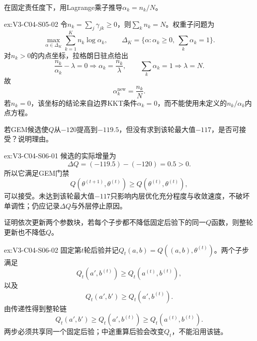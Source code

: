 \begin{SLChapterExercisePairSection}
\begin{exercise}\label{ex:V3-C04-S05-02}
在固定责任度下，用Lagrange乘子推导$\alpha_k=n_k/N$。
\end{exercise}
\ifSLFullEdition
{}\label{sol:V3-C04-S05-02}
\begin{chapterexercisesolution}{ex:V3-C04-S05-02}
令$n_k=\sum_j\gamma_{jk}\geq0$，则$\sum_kn_k=N$。权重子问题为
\[
\max_{\alpha\in\Delta_K}\sum_{k=1}^{K}n_k\log\alpha_k,
\qquad
\Delta_K=\{\alpha:\alpha_k\geq0,\ \sum_k\alpha_k=1\}.
\]
对$n_k>0$的内点坐标，拉格朗日驻点给出
\[
\frac{n_k}{\alpha_k}-\lambda=0
\Longrightarrow
\alpha_k=\frac{n_k}{\lambda},
\qquad
\sum_k\alpha_k=1
\Longrightarrow \lambda=N.
\]
故
\[
\alpha_k^{\mathrm{new}}=\frac{n_k}{N}.
\]
若$n_k=0$，该坐标的结论来自边界KKT条件$\alpha_k=0$，而不能使用未定义的$n_k/\alpha_k$内点方程。
\end{chapterexercisesolution}
\fi

\begin{exercise}\label{ex:V3-C04-S06-01}
若GEM候选使$Q$从$-120$提高到$-119.5$，但没有求到该轮最大值$-117$，是否可接受？说明理由。
\end{exercise}
\ifSLFullEdition
{}\label{sol:V3-C04-S06-01}
\begin{chapterexercisesolution}{ex:V3-C04-S06-01}
候选的实际增量为
\[
\Delta Q=(-119.5)-(-120)=0.5>0.
\]
所以它满足GEM门禁
\[
Q(\theta^{(t+1)},\theta^{(t)})
\geq Q(\theta^{(t)},\theta^{(t)}),
\]
可以接受。未达到该轮最大值$-117$只影响内层优化充分程度与收敛速度，不破坏单调性；仍应记录$\Delta Q$与外层停止原因。
\end{chapterexercisesolution}
\fi

\begin{exercise}\label{ex:V3-C04-S06-02}
证明依次更新两个参数块，若每个子步都不降低固定后验下的同一$Q$函数，则整轮更新也不降低$Q$。
\end{exercise}
\ifSLFullEdition
{}\label{sol:V3-C04-S06-02}
\begin{chapterexercisesolution}{ex:V3-C04-S06-02}
固定第$t$轮后验并记$Q_t(a,b)=Q((a,b),\theta^{(t)})$。两个子步满足
\[
Q_t(a',b^{(t)})\geq Q_t(a^{(t)},b^{(t)}),
\]
以及
\[
Q_t(a',b')\geq Q_t(a',b^{(t)}).
\]
由传递性得到整轮链
\[
Q_t(a',b')
\geq Q_t(a',b^{(t)})
\geq Q_t(a^{(t)},b^{(t)}).
\]
两步必须共享同一个固定后验；中途重算后验会改变$Q_t$，不能沿用该链。
\end{chapterexercisesolution}
\fi


\end{SLChapterExercisePairSection}
